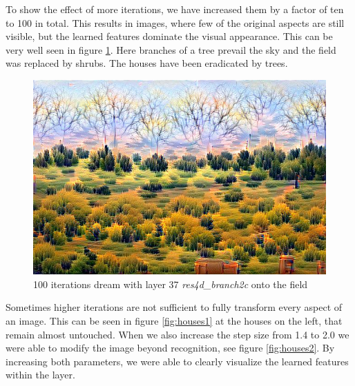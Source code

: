 To show the effect of more iterations, we have increased them by a factor of ten to 100 in total.
This results in images, where few of the original aspects are still visible, but the learned features dominate the visual appearance.
This can be very well seen in figure \ref{fig:baum}.
Here branches of a tree prevail the sky and the field was replaced by shrubs.
The houses have been eradicated by trees.

\begin{figure}[H]
	\centering
	\includegraphics[width=0.7\linewidth]{img/baum}
	\caption{100 iterations dream with layer 37 \emph{res4d\_branch2c} onto the field}
	\label{fig:baum}
\end{figure}

Sometimes higher iterations are not sufficient to fully transform every aspect of an image.
This can be seen in figure \ref{fig:houses1} at the houses on the left, that remain almost untouched.
When we also increase the step size from 1.4 to 2.0 we were able to modify the image beyond recognition, see figure \ref{fig:houses2}.
By increasing both parameters, we were able to clearly visualize the learned features within the layer.


